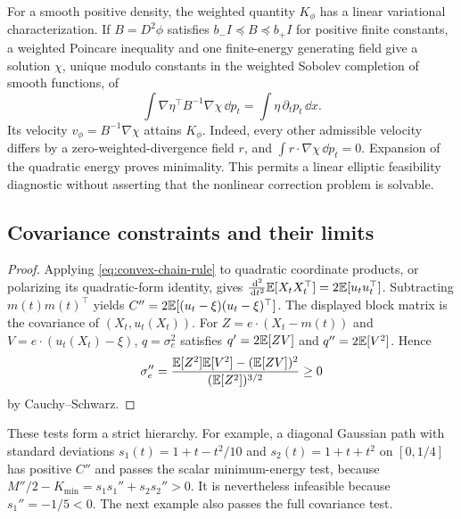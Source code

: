 For a smooth positive density, the weighted quantity $K_\phi$ has a linear
variational characterization.  If $B=D^2\phi$ satisfies $b_-I\preceq B\preceq b_+I$ for positive finite constants, a weighted Poincare
inequality and one finite-energy generating field give a solution $\chi$,
unique modulo constants in the weighted Sobolev completion of smooth
functions, of
\[
 \int \nabla\eta^\top B^{-1}\nabla\chi\,\dd p_t
 =\int\eta\,\partial_t p_t\,\dd x.
\]
Its velocity $v_\phi=B^{-1}\nabla\chi$ attains $K_\phi$.  Indeed, every other
admissible velocity differs by a zero-weighted-divergence field $r$, and
$\int r\cdot\nabla\chi\,\dd p_t=0$.  Expansion of the quadratic energy
proves minimality.  This permits a linear elliptic feasibility diagnostic
without asserting that the nonlinear correction problem is solvable.


\subsection{Covariance constraints and their limits}
\begin{proof}
Applying \eqref{eq:convex-chain-rule} to quadratic coordinate products,
or polarizing its quadratic-form identity, gives
$\frac{\,\mathrm d^2}{\,\mathrm d t^2}\mathbb E[X_tX_t^\top]=2\mathbb E[u_tu_t^\top]$.
Subtracting $m(t)m(t)^\top$ yields
$C''=2\mathbb E[(u_t-\xi)(u_t-\xi)^\top]$.
The displayed block matrix is the covariance of $(X_t,u_t(X_t))$.
For $Z=e\cdot(X_t-m(t))$ and $V=e\cdot(u_t(X_t)-\xi)$,
$q=\sigma_e^2$ satisfies $q'=2\mathbb E[ZV]$ and $q''=2\mathbb E[V^2]$.
Hence
\[
 \sigma_e''=
 \frac{\mathbb E[Z^2]\mathbb E[V^2]-(\mathbb E[ZV])^2}
 {(\mathbb E[Z^2])^{3/2}}\ge0
\]
by Cauchy--Schwarz.
\end{proof}

These tests form a strict hierarchy.  For example, a diagonal Gaussian
path with standard deviations $s_1(t)=1+t-t^2/10$ and
$s_2(t)=1+t+t^2$ on $[0,1/4]$ has positive $C''$ and passes the scalar
minimum-energy test, because
$M''/2-K_{\min}=s_1s_1''+s_2s_2''>0$.
It is nevertheless infeasible because $s_1''=-1/5<0$.
The next example also passes the full covariance test.


